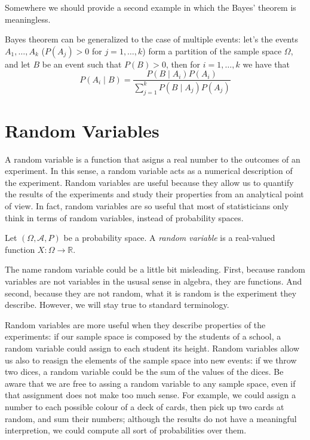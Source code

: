 {\color{red} Somewhere we should provide a second example in which the Bayes' theorem is meaningless.}

Bayes theorem can be generalized to the case of multiple events: let's the events $A_{1}, \ldots, A_{k}$ ($P\left( A_{j} \right)>0$ for $j=1, \ldots, k$) form a partition of the sample space $\Omega$, and let $B$ be an event such that $P\left(B\right)>0$, then for $i=1, \ldots, k$ we have that
\[
P\left(A_{i}\mid B\right)=\frac{P\left(B\mid A_{i}\right) P\left(A_{i}\right)}{\sum_{j=1}^{k} P\left(B \mid A_{j}\right) P\left(A_{j}\right)}
\]


%
%

\section{Random Variables}
\label{sec:probability_random_variables}

A random variable is a function that asigns a real number to the outcomes of an experiment. In this sense, a random variable acts as a numerical description of the experiment. Random variables are useful because they allow us to quantify the results of the experiments and study their properties from an analytical point of view. In fact, random variables are so useful that most of statisticians only think in terms of random variables, instead of probability spaces.

\begin{definition}
Let $\left( \Omega, \mathcal{A} , P \right)$ be a probability space. A \emph{random variable} is a real-valued function $X : \Omega \rightarrow \mathbb{R}$.
\end{definition}

The name random variable could be a little bit misleading. First, because random variables are not variables in the ususal sense in algebra, they are functions. And second, because they are not random, what it is random is the experiment they describe. However, we will stay true to standard terminology.

Random variables are more useful when they describe properties of the experiments: if our sample space is composed by the students of a school, a random variable could assign to each student its height. Random variables allow us also to reasign the elements of the sample space into new events: if we throw two dices, a random variable could be the sum of the values of the dices. Be aware that we are free to assing a random variable to any sample space, even if that assignment does not make too much sense. For example, we could assign a number to each possible colour of a deck of cards, then pick up two cards at random, and sum their numbers; although the results do not have a meaningful interpretion, we could compute all sort of probabilities over them.

